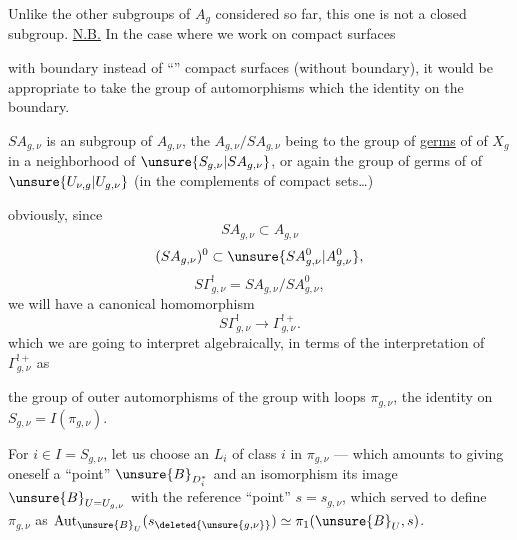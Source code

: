 Unlike the other subgroups of $A_g$ considered so far, this one is not a closed subgroup. \uline{N.B.} In the case where we work on compact surfaces


with boundary instead of ``'' compact surfaces (without boundary), it would be appropriate to take the group of automorphisms which  the identity on the boundary.

$SA_{g,\nu}$ is an  subgroup of $A_{g,\nu}$, the  $A_{g,\nu}/SA_{g,\nu}$ being  to the group of \uline{germs} of  of $X_g$ in a neighborhood of $\unsure{S_{g,\nu}|SA_{g,\nu}}$, or again the group of germs  of  of $\unsure{U_{\nu,g}|U_{g,\nu}}$ (in the complements of compact sets\ldots)

  obviously, since
\[
SA_{g,\nu}\subset A_{g,\nu}
\]
\[
(SA_{g,\nu})^{0}\subset \unsure{SA_{g,\nu}^{0}|A_{g,\nu}^{0}},
\]
\[
S\Gamma_{g,\nu}^{!}=SA_{g,\nu}/SA_{g,\nu}^{0},
\]
we will have a canonical homomorphism
\[
S\Gamma_{g,\nu}^{!}\longrightarrow\Gamma_{g,\nu}^{!+}.
\]
which we are going to interpret algebraically, in terms of the interpretation of $\Gamma_{g,\nu}^{!+}$ \inserted{$=\Gamma^{!}$} as


the group of outer automorphisms of the group with loops $\pi_{g,\nu}$,  the identity on $S_{g,\nu}=I(\pi_{g,\nu})$.

  For $i\in I=S_{g,\nu}$, let us choose an \deleted{$\unsure{\ell}$} $L_i$ of class $i$ in $\pi_{g,\nu}$ --- which amounts to giving oneself a ``point''  $\unsure{B}_{D_i^{*}}$   and an isomorphism  its image  $\unsure{B}_{U=U_{g,\nu}}$ with the  reference ``point'' $s=s_{g,\nu}$, which served to define $\pi_{g,\nu}$ as $\operatorname{Aut}_{\unsure{B}_U}(s_{\deleted{\unsure{g,\nu}}})\simeq\pi_1(\unsure{B}_U,s)$.

